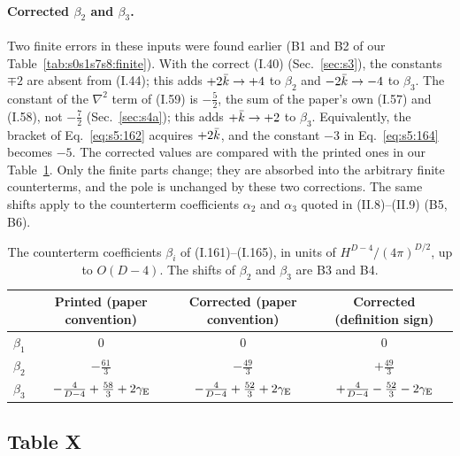\documentclass[aps,prd,onecolumn,10pt,nofootinbib,floatfix]{revtex4-2}
\newcommand{\eqI}[1]{(I.#1)}
\newcommand{\eqII}[1]{(II.#1)}
\begin{document}
\paragraph*{Corrected $\beta_2$ and $\beta_3$.}
Two finite errors in these inputs were found earlier (B1 and B2 of our Table~\ref{tab:s0s1s7s8:finite}).
With the correct \eqI{40} (Sec.~\ref{sec:s3}), the constants $\mp2$ are absent from \eqI{44}; this adds $+2\bar k\to+4$ to $\beta_2$ and $-2\bar k\to-4$ to $\beta_3$.
The constant of the $\nabla^2$ term of \eqI{59} is $-\frac52$, the sum of the paper's own \eqI{57} and \eqI{58}, not $-\frac72$ (Sec.~\ref{sec:s4a}); this adds $+\bar k\to+2$ to $\beta_3$.
Equivalently, the bracket of Eq.~\eqref{eq:s5:162} acquires $+2\bar k$, and the constant $-3$ in Eq.~\eqref{eq:s5:164} becomes $-5$.
The corrected values are compared with the printed ones in our Table~\ref{tab:s5:beta}.
Only the finite parts change; they are absorbed into the arbitrary finite counterterms, and the pole is unchanged by these two corrections.
The same shifts apply to the counterterm coefficients $\alpha_2$ and $\alpha_3$ quoted in \eqII{8}--\eqII{9} (B5, B6).

\begin{table}[tb]
\caption{The counterterm coefficients $\beta_i$ of \eqI{161}--\eqI{165}, in units of $H^{D-4}/(4\pi)^{D/2}$, up to $O(D-4)$. The shifts of $\beta_2$ and $\beta_3$ are B3 and B4.}
\label{tab:s5:beta}
\renewcommand{\arraystretch}{1.45}
\begin{ruledtabular}
\begin{tabular}{lccc}
& Printed (paper convention) & Corrected (paper convention) & Corrected (definition sign)\\
\hline
$\beta_1$ & $0$ & $0$ & $0$\\
$\beta_2$ & $-\frac{61}{3}$ & $-\frac{49}{3}$ & $+\frac{49}{3}$\\
$\beta_3$ & $-\frac{4}{D-4}+\frac{58}{3}+2\gamma_{\rm E}$ & $-\frac{4}{D-4}+\frac{52}{3}+2\gamma_{\rm E}$ & $+\frac{4}{D-4}-\frac{52}{3}-2\gamma_{\rm E}$\\
\end{tabular}
\end{ruledtabular}
\end{table}

\subsection{Table X}
\label{sec:s5:TX}
\end{document}
